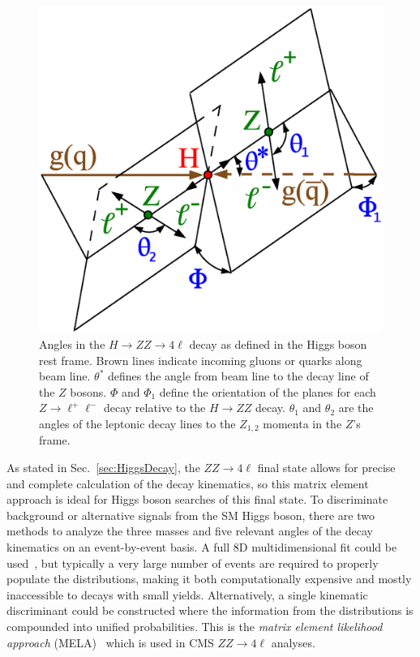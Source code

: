 \begin{figure}[htbp]
\begin{center}
\includegraphics[width=.5\linewidth]{Phenomenology/figures/angles-HZZ4l.eps}
\caption[Definition of Angles in $H\rightarrow VV$ Decay]{Angles in the $H\rightarrow ZZ \rightarrow 4\ell$ decay as defined in the Higgs boson rest frame. Brown lines indicate incoming gluons or quarks along beam line. $\theta^*$ defines the angle from beam line to the decay line of the $Z$ bosons. $\Phi$ and $\Phi_1$ define the orientation of the planes for each $Z\rightarrow \ell^+\ell^-$ decay relative to the $H \rightarrow ZZ$ decay. $\theta_1$ and $\theta_2$ are the angles of the leptonic decay lines to the $Z_{1,2}$ momenta in the $Z$'s frame.}
\label{fig:HVVAngles}
\end{center}
\end{figure}

As stated in Sec.~\ref{sec:HiggsDecay}, the $ZZ\rightarrow 4\ell$ final state allows for precise and complete calculation of the decay kinematics, so this matrix element approach is ideal for Higgs boson searches of this final state. To discriminate background or alternative signals from the SM Higgs boson, there are two methods to analyze the three masses and five relevant angles of the decay kinematics on an event-by-event basis. A full 8D multidimensional fit could be used~\cite{Chen:2014pia}, but typically a very large number of events are required to properly populate the distributions, making it both computationally expensive and mostly inaccessible to decays with small yields. Alternatively, a single kinematic discriminant could be constructed where the information from the distributions is compounded into unified probabilities. This is the \textit{matrix element likelihood approach} (MELA)~\cite{Gao:2010qx,Bolognesi:2012mm} which is used in CMS $ZZ\rightarrow 4\ell$ analyses.

